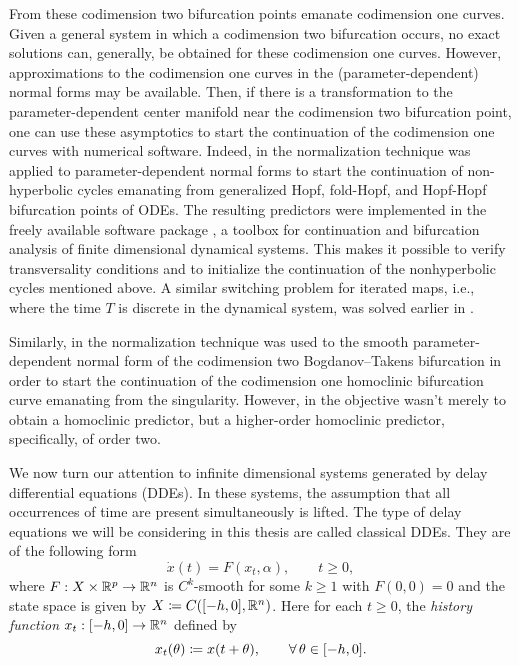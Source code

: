 From these codimension two bifurcation points emanate codimension one curves.
Given a general system in which a codimension two bifurcation occurs, no exact
solutions can, generally, be obtained for these codimension one curves.
However, approximations to the codimension one curves in the
(parameter-dependent) normal forms may be available. Then, if there is a
transformation to the parameter-dependent center manifold near the
codimension two bifurcation point, one can use these asymptotics to start
the continuation of the codimension one curves with numerical software.
Indeed, in \cite{Kuznetsov2008} the normalization technique was applied to
parameter-dependent normal forms to start the continuation of non-hyperbolic
cycles emanating from generalized Hopf, fold-Hopf, and Hopf-Hopf bifurcation
points of ODEs. The resulting predictors were implemented in the freely
available software package \MATCONT \cite{matcont1}, a \MATLAB toolbox for
continuation and bifurcation analysis of finite dimensional dynamical systems.
This makes it possible to verify transversality conditions and to initialize
the continuation of the nonhyperbolic cycles mentioned above. A similar
switching problem for iterated maps, i.e., where the time $T$ is discrete in
the dynamical system, was solved earlier in \cite{Govaerts2007maps}.

Similarly, in \cite{Kuznetsov2014improved} the normalization technique was used
to the smooth parameter-dependent normal form of the codimension two
Bogdanov--Takens bifurcation in order to start the continuation of the
codimension one homoclinic bifurcation curve emanating from the singularity.
However, in \cite{Kuznetsov2014improved} the objective wasn't merely to obtain
a homoclinic predictor, but a higher-order homoclinic predictor, specifically,
of order two. 

We now turn our attention to infinite dimensional systems generated by delay
differential equations (DDEs). In these systems, the assumption that all
occurrences of time are present simultaneously is lifted. The type of delay equations
we will be considering in this thesis are called classical DDEs. They are of the
following form
\begin{equation}
    \dot{x}(t)= F(x_t, \alpha), \qquad t \ge 0,
\end{equation}
where $F: X \times \mathbb{R}^p \to \mathbb{R}^n$ is $C^k$-smooth for some $k \ge 1$ with
$F(0,0) = 0$ and the state space is given by $X \coloneqq C([-h,0],\mathbb{R}^n)$. Here for
each $t \ge 0$, the \emph{history function} $x_t : [-h,0] \to \mathbb{R}^n$ defined by
\[
  x_t(\theta) \coloneqq x(t + \theta), \qquad \forall\,\theta \in [-h,0].
\]

